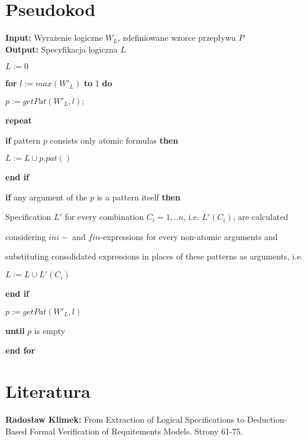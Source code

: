 \documentclass[a4paper, 11pt]{article}
\begin{document}
	\section{Pseudokod}
	\textbf{Input:} Wyrażenie logiczne $W_L$, zdefiniowane wzorce przepływu $P$\\
	\textbf{Output:} Specyfikacja logiczna $L$
	
	$L:=0$
	
	\textbf{for} $l:=max(W'_L)$ \textbf{to} 1 \textbf{do}
	
	\hspace{0.5cm}$p:=getPat(W'_L,l);$
	
	\hspace{0.5cm}\textbf{repeat}
	
	\hspace{1cm}\textbf{if} pattern $p$ consists only atomic formulas \textbf{then}
	
	\hspace{1.5cm}$L:=L\cup p.pat()$
	
	\hspace{1cm}\textbf{end if}
	
	\hspace{1cm}\textbf{if} any argument of the $p$ is a pattern itself \textbf{then}
	
	\hspace{1.5cm}Specification $L'$ for every combination $C_i=1,..n$, i.e. $L'(C_i)$, are calculated 
	
	 \hspace{1.5cm}considering $ini-$ and $fin$-expressions for every non-atomic arguments and 
	 
	 \hspace{1.5cm}substituting consolidated 
	expressions in places of these patterns as arguments, i.e. 
	
	\hspace{1.5cm}$L:=L\cup L'(C_i)$
	
	\hspace{1cm}\textbf{end if}
	
	\hspace{1cm}$p:=getPat(W'_L,l)$
	
	\hspace{0.5cm}\textbf{until} $p$ is empty
	
	\textbf{end for}
	
	\section{Literatura}
	\textbf{Radosław Klimek:} From Extraction of Logical Specifications to Deduction-Based Formal Verification of Requitements Models. Strony 61-75.\\
	
	
	
	
\end{document}
